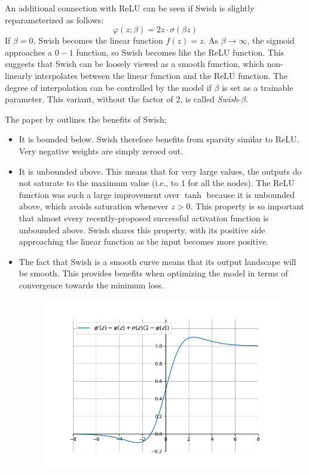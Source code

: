 \documentclass[12pt]{report}
\numberwithin{equation}{section}
\begin{document}
An additional connection with ReLU can be seen if Swish is slightly reparameterized as follows:
\[
\varphi(z;\beta) = 2z\cdot \sigma(\beta z)
\]
If $\beta= 0$, Swish becomes the linear function $f(z) = z$. As $\beta \rightarrow \infty$, the sigmoid approaches a $0-1$ function, so Swish becomes like the ReLU function. This suggests that Swish can be loosely viewed as a smooth function, which non-linearly interpolates between the linear function and the ReLU function. The degree of interpolation can be controlled by the model if $\beta$ is set as a trainable parameter. This variant, without the factor of 2, is called \textit{Swish-$\beta$}.

The paper by \textbf{\cite{DBLP:journals/corr/abs-1710-05941}} outlines the benefits of Swish;
\begin{itemize}[label=-]
\item It is bounded below. Swish therefore benefits from sparsity similar to ReLU. Very negative weights are simply zeroed out.
\item It is unbounded above. This means that for very large values, the outputs do not saturate to the maximum value (i.e., to $1$ for all the nodes). The ReLU function was such a large improvement over $\tanh$ because it is unbounded above, which avoids saturation whenever $z > 0$. This property is so important that almost every recently-proposed successful activation function is unbounded above. Swish shares this property, with its positive side approaching the linear function as the input becomes more positive.
\item The fact that Swish is a smooth curve means that its output landscape will be smooth. This provides benefits when optimizing the model in terms of convergence towards the minimum loss.
\begin{figure}[htb!]
\centering 
\includegraphics[scale=0.9]{png/swish_prime.png} 

\end{figure}
\end{itemize}
\end{document}
